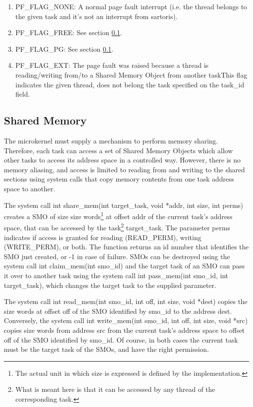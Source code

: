 \documentclass[11pt, letterpaper, twoside, english]{book}
\begin{document}
\begin{enumerate}
\item[] \textsf{PF\_FLAG\_NONE}: A normal page fault interrupt (i.e. the thread belongs to the given task and it's not an interrupt from sartoris).
\item[] \textsf{PF\_FLAG\_FREE}: See section \ref{sec:dynamicmemory}.
\item[] \textsf{PF\_FLAG\_PG}: See section \ref{sec:dynamicmemory}.
\item[] \textsf{PF\_FLAG\_EXT}: The page fault was raised because a thread is reading/writing from/to a Shared Memory Object from another taskThis flag indicates the given thread, does not belong the task specified on the \textsf{task\_id} field.
\end{enumerate}

\subsection{Shared Memory} \label{sec:dynamicmemory}

The microkernel must supply a mechanism to perform memory sharing. Therefore, each task can access a set of Shared Memory Objects which allow other tasks to access its address space in a controlled way. However, there is no memory aliasing, and access is limited to reading from and writing to the shared sections using system calls that copy memory contents from one task address space to another.

The system call \textsf{int share\_mem(int target\_task, void *addr, int size, int perms)} creates a SMO of size \textsf{size} words\footnote{The actual unit in which size is expressed is defined by the implementation.} at offset \textsf{addr} of the current task's address space, that can be accessed by the task\footnote{What is meant here is that it can be accessed by any thread of the corresponding task.} \textsf{target\_task}. The parameter \textsf{perms} indicates if access is granted for reading (\textsf{READ\_PERM}), writing (\textsf{WRITE\_PERM}), or both. The function returns an id number that identifies the SMO just created, or -1 in case of failure. SMOs can be destroyed using the system call \textsf{int claim\_mem(int smo\_id)} and the target task of an SMO can pass it over to another task using the system call \textsf{int pass\_mem(int smo\_id, int target\_task)}, which changes the target task to the supplied parameter.

The system call \textsf{int read\_mem(int smo\_id, int off, int size, void *dest)} copies the \textsf{size} words at offset \textsf{off} of the SMO identified by \textsf{smo\_id} to the address \textsf{dest}. Conversely, the system call \textsf{int write\_mem(int smo\_id, int off, int size, void *src)} copies \textsf{size} words from address \textsf{src} from the current task's address space to offset \textsf{off} of the SMO identified by \textsf{smo\_id}. Of course, in both cases the current task must be the target task of the SMOs, and have the right permission.
\end{document}
